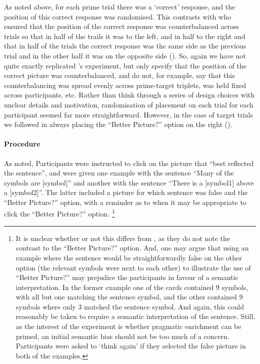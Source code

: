 \documentclass[10pt]{article}
\begin{document}
\begin{multicols}{2}
As noted above, for each prime trial there was a `correct' response, and the position of this correct response was randomised.
This contrasts with \citeauthor{Bott:2016aa} who ensured that the position of the correct response was counterbalanced across trials so that in half of the trails it was to the left, and in half to the right and that in half of the trials the correct response was the same side as the previous trial and in the other half it was on the opposite side (\citeyear[124]{Bott:2016aa}).
So, again we have not quite exactly replicated \citeauthor{Bott:2016aa}'s experiment, but \citeauthor{Bott:2016aa} only specify that the position of the correct picture was counterbalanced, and do not, for example, say that this counterbalancing was spread evenly across prime-target triplets, was held fixed across participants, etc.
Rather than think through a series of design choices with unclear details and motivation, randomisation of placement on each trial for each participant seemed far more straightforward.
However, in the case of target trials we followed \citeauthor{Bott:2016aa} in always placing the ``Better Picture?'' option on the right (\citeyear[124]{Bott:2016aa}).

\paragraph{Procedure}

As noted, Participants were instructed to click on the picture that ``best reflected the sentence'', and were given one example with the sentence ``Many of the symbols are [symbol]'' and another with the sentence ``There is a [symbol1] above a [symbol2]''.
The latter included a picture for which sentence was false and the ``Better Picture?'' option, with a reminder as to when it may be appropriate to click the ``Better Picture?'' option.\nolinebreak
\footnote{It is unclear whether or not this differs from \citeauthor{Bott:2016aa}, as they do not note the contrast to the ``Better Picture?'' option.
  And, one may argue that using an example where the sentence would be straightforwardly false on the other option (the relevant symbols were next to each other) to illustrate the use of ``Better Picture?'' may prejudice the participants in favour of a semantic interpretation.
  In the former example one of the cards contained 9 symbols, with all but one matching the sentence symbol, and the other contained 9 symbols where only 3 matched the sentence symbol.
  And again, this could reasonably be taken to require a semantic interpretation of the sentence.
  Still, as the interest of the experiment is whether pragmatic enrichment can be primed, an initial semantic bias should not be too much of a concern.
  Participants were asked to `think again' if they selected the false picture in both of the examples.
}


\end{multicols}
\end{document}
